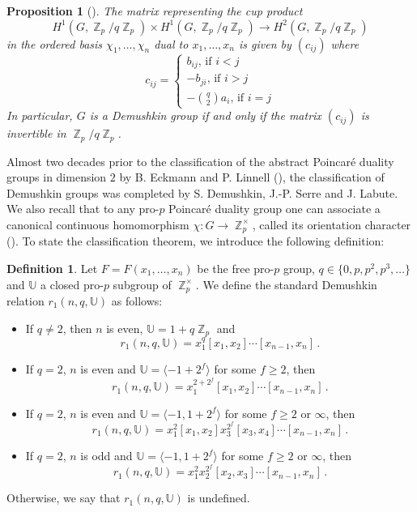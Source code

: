 \documentclass[a4paper]{amsart}
\DeclareMathOperator{\bbz}{\mathbb{Z}}
\newtheorem{prop}[thm]{Proposition}
\theoremstyle{definition}
\newtheorem{defn}[thm]{Definition}
\begin{document}
\begin{prop}[{\cite[Prop. 3.9.13]{neukirchCohomologyNumberFields2008}}]\label{prop-cup-product} The matrix representing the cup product \[H^1(G,\bbz_p/q\bbz_p) \times H^1(G,\bbz_p/q\bbz_p) \to H^2(G,\bbz_p/q\bbz_p)\] in the ordered basis \(\chi_1,\ldots,\chi_n\) dual to \(x_1,\ldots,x_n\) is given by \((c_{ij})\) where \[c_{ij} = \begin{cases}
    b_{ij}\text{, if }i<j\\
    -b_{ji}\text{, if }i > j\\
    -\binom{q}{2}a_i\text{, if } i = j
\end{cases}\] In particular, \(G\) is a Demushkin group if and only if the matrix \((c_{ij})\) is invertible in \(\bbz_p/q\bbz_p\).
\end{prop}

Almost two decades prior to the classification of the abstract Poincaré duality groups in dimension \(2\) by B. Eckmann and P. Linnell (\cite{eckmannPoincareDualityGroups1983}), the classification of Demushkin groups was completed by S. Demushkin, J.-P. Serre and J. Labute. We also recall that to any pro-\(p\) Poincaré duality group one can associate a canonical continuous homomorphism \(\chi\colon G \to \bbz_p^\times\), called its orientation character (\cite[Sec. I.4.5]{serreGaloisCohomology1997}). To state the classification theorem, we introduce the following definition:

\begin{defn} Let \(F = F(x_1,\ldots,x_n)\) be the free pro-\(p\) group, \(q \in \{0,p,p^2,p^3,\ldots\}\) and \(\mathbb{U}\) a closed pro-\(p\) subgroup of \(\bbz_p^\times\). We define the standard Demushkin relation \(r_1(n,q,\mathbb{U})\) as follows:
\begin{itemize}
    \item If \(q \neq 2\), then \(n\) is even, \(\mathbb{U} = 1 + q\bbz_p\) and \[r_1(n,q,\mathbb{U}) = x_1^q[x_1,x_2]\cdots [x_{n-1},x_n]\,.\]
    \item If \(q  = 2\), \(n\) is even and \(\mathbb{U} = \langle -1 + 2^f\rangle\) for some \(f \geq 2\), then \[r_1(n,q,\mathbb{U}) = x_1^{2+2^f}[x_1,x_2]\cdots [x_{n-1},x_n]\,.\]
    \item If \(q = 2\), \(n\) is even and \(\mathbb{U} = \langle -1, 1+2^f\rangle\) for some \(f \geq 2\) or \(\infty\), then \[r_1(n,q,\mathbb{U}) = x_1^2[x_1,x_2]x_3^{2^f}[x_3,x_4]\cdots [x_{n-1},x_n]\,.\]
    \item If \(q = 2\), \(n\) is odd and \(\mathbb{U} = \langle -1, 1+2^f\rangle\) for some \(f \geq 2\) or \(\infty\), then \[r_1(n,q,\mathbb{U}) = x_1^2x_2^{2^f}[x_2,x_3]\cdots [x_{n-1},x_n]\,.\]
\end{itemize}
Otherwise, we say that \(r_1(n,q,\mathbb{U})\) is undefined.
\end{defn}
\end{document}
